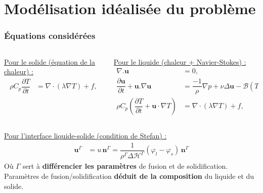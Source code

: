 \documentclass{beamer}
\newcommand{\vect}[1]{\bm{#1}}
\renewcommand{\frac}{\dfrac}
\begin{document}
\section{Modélisation idéalisée du problème}
\begin{frame}
    \frametitle{Équations considérées}
    \footnotesize

\begin{columns}[T]
    \begin{column}[T]{0.45\textwidth}
    \begin{center}
    \color{cea_rouge}\underline{Pour le solide (équation de la chaleur) :}\color{cea_texte}
    \begin{align*}
    	\rho C_p \frac{\partial T}{\partial t}  &=\nabla\cdot\left(\lambda \nabla T\right) + f,
    \end{align*}
        \end{center}
    \end{column}
    
    
    \begin{column}[T]{0.55\textwidth}
    \begin{center}
\color{cea_rouge}\underline{Pour le liquide (chaleur + Navier-Stokes) :} \color{cea_texte}
\begin{align*}
\nabla. \vect{u} &= 0,\\
\frac{ \partial \vect{u}}{\partial t} + \vect{u}.\nabla \vect{u} &= \frac{-1}{\rho} \nabla p + \nu \Delta \vect{u} - \mathcal{B}(T-T^{\text{ref}}) \vect{g} ,\\
\rho C_p (\frac{\partial T}{\partial t} + \vect{u} \cdot \nabla T ) &= \nabla\cdot\left(\lambda \nabla T\right) + f,
\end{align*}
    \end{center}
\end{column}
\end{columns}
\hspace{-1.8cm}
\begin{center}
\color{cea_rouge}\underline{Pour l'interface liquide-solide (condition de Stefan) :}\color{cea_texte}
\begin{align*}
	\vect{u}^\Gamma &= u \, \vect{n}^\Gamma = \frac{1}{\rho^{\Gamma} \Delta \mathcal{H}^{\Gamma}} (\varphi_l - \varphi_s) \, \vect{n}^\Gamma
\end{align*}
Où $\Gamma$ sert à \textbf{différencier les paramètres} de fusion et de solidification.\\
\vspace{0.3cm}
Paramètres de fusion/solidification \textbf{déduit de la composition} du liquide et du solide.
\end{center}
\end{frame}
\end{document}
